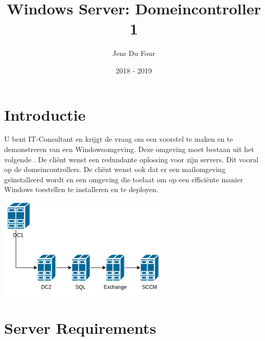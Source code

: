 \documentclass[a4paper]{article}
\title{Windows Server: Domeincontroller 1}
\author{Jens Du Four}
\date{2018 - 2019}
\begin{document}
\maketitle

\section{Introductie}
U bent IT-Consultant en krijgt de vraag om een voorstel te maken en te demonstreren van een Windowsomgeving. Deze omgeving moet bestaan uit het volgende . De cliënt wenst een redundante oplossing voor zijn servers. Dit vooral op de domeincontrollers. De cliënt wenst ook dat er een mailomgeving geïnstalleerd wordt en een omgeving die toelaat om op een efficiënte manier Windows toestellen te installeren en te deployen.

\begin{center}
\includegraphics[width=8cm]{Netwerkdiagram.png}
\end{center}

\section{Server Requirements}
\end{document}
